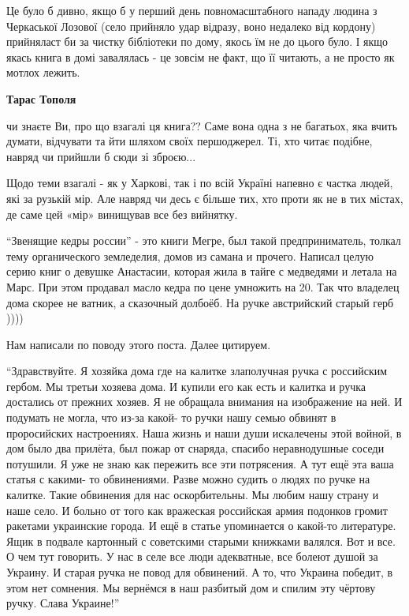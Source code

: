 \begin{itemize}
\begin{itemize}
Це було б дивно, якщо б у перший день повномасштабного нападу людина з
Черкаської Лозової (село прийняло удар відразу, воно недалеко від кордону)
прийняласт би за чистку бібліотеки по дому, якось їм не до цього було. І якщо
якась книга в домі завалялась - це зовсім не факт, що її читають, а не просто
як мотлох лежить.

\textbf{Тарас Тополя} 

чи знаєте Ви, про що взагалі ця книга?? Саме вона одна з не багатьох, яка вчить
думати, відчувати та йти шляхом своїх першоджерел. Ті, хто читає подібне,
навряд чи прийшли б сюди зі зброєю...

Щодо теми взагалі - як у Харкові, так і по всій Україні напевно є частка людей,
які за рузькій мір. Але навряд чи десь є більше тих, хто проти як не в тих
містах, де саме цей «мір» винищував все без вийнятку.


\enquote{Звенящие кедры россии} - это книги Мегре, был такой предприниматель, толкал
тему органического земледелия, домов из самана и прочего. Написал целую серию
книг о девушке Анастасии, которая жила в тайге с медведями и летала на Марс.
При этом продавал масло кедра по цене умножить на 20. Так что владелец дома
скорее не ватник, а сказочный долбоёб. На ручке австрийский старый герб ))))


Нам написали по поводу этого поста. Далее цитируем.

\enquote{Здравствуйте. Я хозяйка дома где на калитке злаполучная ручка с российским
гербом. Мы третьи хозяева дома. И купили его как есть и калитка и ручка
достались от прежних хозяев. Я не обращала внимания на изображение на ней. И
подумать не могла, что из-за какой- то ручки нашу семью обвинят в проросийских
настроениях. Наша жизнь и наши души искалечены этой войной, в дом было два
прилёта, был пожар от снаряда, спасибо неравнодушные соседи потушили. Я уже не
знаю как пережить все эти потрясения. А тут ещё эта ваша статья с какими- то
обвинениями. Разве можно судить о людях по ручке на калитке. Такие обвинения
для нас оскорбительны. Мы любим нашу страну и наше село. И больно от того как
вражеская российская армия подонков громит ракетами украинские города. И ещё в
статье упоминается о какой-то литературе. Ящик в подвале картонный с советскими
старыми книжками валялся. Вот и все. О чем тут говорить.  У нас в селе все люди
адекватные, все болеют душой за Украину. И старая ручка не повод для обвинений.
А то, что Украина победит, в этом нет сомнения. Мы вернёмся в наш разбитый дом
и спилим эту чёртову ручку. Слава Украине!}


\end{itemize}
\end{itemize}
